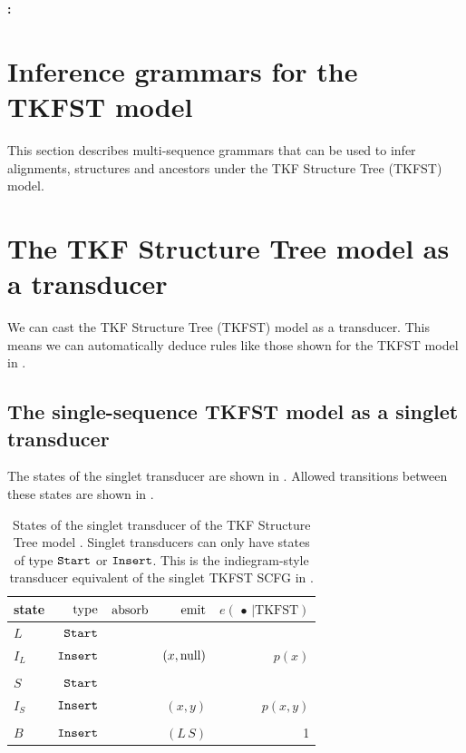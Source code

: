 \documentclass[10pt]{article}
\date{}
\begin{document}
\begin{flushleft}
  {\Large
    \textbf{\titlestring: }
  }
\\
\authorstring
\end{flushleft}

\newpage
\section{Inference grammars for the TKFST model}

This section describes multi-sequence grammars that can be used to infer alignments, structures and ancestors under the
TKF Structure Tree (TKFST) model.



\newpage
\section{The TKF Structure Tree model as a transducer} 

We can cast the TKF Structure Tree (TKFST) model as a transducer.
This means we can automatically deduce rules like those shown for the TKFST model in .

\subsection{The single-sequence TKFST model as a singlet transducer}

The states of the singlet transducer are shown in .
Allowed transitions between these states are shown in .

\begin{table}[!ht]
  \centering
  \begin{tabular}{lrrrr}
    state & $\operatorname{type}$ & $\operatorname{absorb}$ & $\operatorname{emit}$ & $e(\,\bullet\,|\mathrm{TKFST})$ \\ \hline
    $L$ & $\mathtt{Start}$ \\
    $I_L$ & $\mathtt{Insert}$ & & $(x,\mathrm{null})$ & $p(x)$ \\
    \\
    $S$ & $\mathtt{Start}$ \\
    $I_S$ & $\mathtt{Insert}$ & & $(x,y)$ & $p(x,y)$ \\
    \\
    $B$ & $\mathtt{Insert}$ & & $(L\,S)$ & 1 \\
  \end{tabular}
  \caption{
    States of the singlet transducer of the TKF Structure Tree model \cite{Holmes2004}.
    Singlet transducers can only have states of type $\mathtt{Start}$ or $\mathtt{Insert}$.
    This is the indiegram-style transducer equivalent of the singlet TKFST SCFG in .
  }
\end{table}
\end{document}
